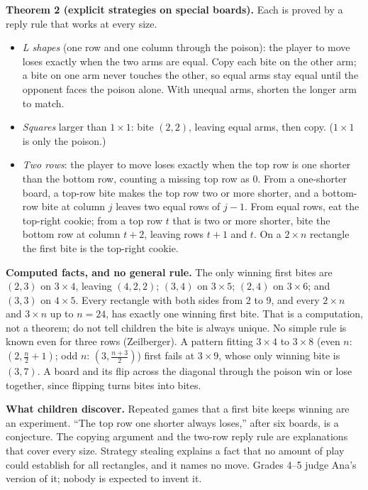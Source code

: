 \documentclass[11pt]{article}
\newcommand{\pos}[1]{$(#1)$}
\begin{document}
\textbf{Theorem 2 (explicit strategies on special boards).} Each is proved by a reply rule that works at every size.
\begin{itemize}[topsep=0pt,itemsep=1pt,parsep=0pt,leftmargin=1.2em]
\item \emph{L shapes} (one row and one column through the poison): the player to move loses exactly when the two arms are equal. Copy each bite on the other arm; a bite on one arm never touches the other, so equal arms stay equal until the opponent faces the poison alone. With unequal arms, shorten the longer arm to match.
\item \emph{Squares} larger than $1\times1$: bite $(2,2)$, leaving equal arms, then copy. ($1\times1$ is only the poison.)
\item \emph{Two rows}: the player to move loses exactly when the top row is one shorter than the bottom row, counting a missing top row as 0. From a one-shorter board, a top-row bite makes the top row two or more shorter, and a bottom-row bite at column $j$ leaves two equal rows of $j-1$. From equal rows, eat the top-right cookie; from a top row $t$ that is two or more shorter, bite the bottom row at column $t+2$, leaving rows $t+1$ and $t$. On a $2\times n$ rectangle the first bite is the top-right cookie.
\end{itemize}

\textbf{Computed facts, and no general rule.} The only winning first bites are $(2,3)$ on $3\times4$, leaving \pos{4,2,2}; $(3,4)$ on $3\times5$; $(2,4)$ on $3\times6$; and $(3,3)$ on $4\times5$. Every rectangle with both sides from 2 to 9, and every $2\times n$ and $3\times n$ up to $n=24$, has exactly one winning first bite. That is a computation, not a theorem; do not tell children the bite is always unique. No simple rule is known even for three rows (Zeilberger). A pattern fitting $3\times4$ to $3\times8$ (even $n$: $(2,\tfrac n2+1)$; odd $n$: $(3,\tfrac{n+3}2)$) first fails at $3\times9$, whose only winning bite is $(3,7)$. A board and its flip across the diagonal through the poison win or lose together, since flipping turns bites into bites.

\textbf{What children discover.} Repeated games that a first bite keeps winning are an experiment. ``The top row one shorter always loses,'' after six boards, is a conjecture. The copying argument and the two-row reply rule are explanations that cover every size. Strategy stealing explains a fact that no amount of play could establish for all rectangles, and it names no move. Grades 4--5 judge Ana's version of it; nobody is expected to invent it.
\end{document}
